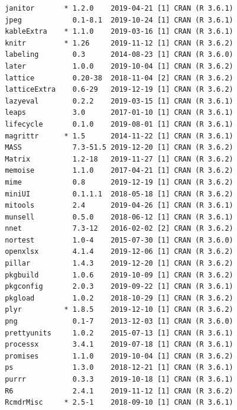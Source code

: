 \documentclass[12pt,twoside]{reedthesis}
\begin{document}
\begin{verbatim}
 janitor       * 1.2.0    2019-04-21 [1] CRAN (R 3.6.1)                    
 jpeg            0.1-8.1  2019-10-24 [1] CRAN (R 3.6.1)                    
 kableExtra    * 1.1.0    2019-03-16 [1] CRAN (R 3.6.1)                    
 knitr         * 1.26     2019-11-12 [1] CRAN (R 3.6.2)                    
 labeling        0.3      2014-08-23 [1] CRAN (R 3.6.0)                    
 later           1.0.0    2019-10-04 [1] CRAN (R 3.6.2)                    
 lattice         0.20-38  2018-11-04 [2] CRAN (R 3.6.2)                    
 latticeExtra    0.6-29   2019-12-19 [1] CRAN (R 3.6.2)                    
 lazyeval        0.2.2    2019-03-15 [1] CRAN (R 3.6.1)                    
 leaps           3.0      2017-01-10 [1] CRAN (R 3.6.1)                    
 lifecycle       0.1.0    2019-08-01 [1] CRAN (R 3.6.1)                    
 magrittr      * 1.5      2014-11-22 [1] CRAN (R 3.6.1)                    
 MASS            7.3-51.5 2019-12-20 [1] CRAN (R 3.6.2)                    
 Matrix          1.2-18   2019-11-27 [1] CRAN (R 3.6.2)                    
 memoise         1.1.0    2017-04-21 [1] CRAN (R 3.6.2)                    
 mime            0.8      2019-12-19 [1] CRAN (R 3.6.2)                    
 miniUI          0.1.1.1  2018-05-18 [1] CRAN (R 3.6.2)                    
 mitools         2.4      2019-04-26 [1] CRAN (R 3.6.1)                    
 munsell         0.5.0    2018-06-12 [1] CRAN (R 3.6.1)                    
 nnet            7.3-12   2016-02-02 [2] CRAN (R 3.6.2)                    
 nortest         1.0-4    2015-07-30 [1] CRAN (R 3.6.0)                    
 openxlsx        4.1.4    2019-12-06 [1] CRAN (R 3.6.2)                    
 pillar          1.4.3    2019-12-20 [1] CRAN (R 3.6.2)                    
 pkgbuild        1.0.6    2019-10-09 [1] CRAN (R 3.6.2)                    
 pkgconfig       2.0.3    2019-09-22 [1] CRAN (R 3.6.1)                    
 pkgload         1.0.2    2018-10-29 [1] CRAN (R 3.6.2)                    
 plyr          * 1.8.5    2019-12-10 [1] CRAN (R 3.6.2)                    
 png             0.1-7    2013-12-03 [1] CRAN (R 3.6.0)                    
 prettyunits     1.0.2    2015-07-13 [1] CRAN (R 3.6.1)                    
 processx        3.4.1    2019-07-18 [1] CRAN (R 3.6.1)                    
 promises        1.1.0    2019-10-04 [1] CRAN (R 3.6.2)                    
 ps              1.3.0    2018-12-21 [1] CRAN (R 3.6.1)                    
 purrr           0.3.3    2019-10-18 [1] CRAN (R 3.6.1)                    
 R6              2.4.1    2019-11-12 [1] CRAN (R 3.6.2)                    
 RcmdrMisc     * 2.5-1    2018-09-10 [1] CRAN (R 3.6.1)                    

\end{verbatim}
\end{document}
